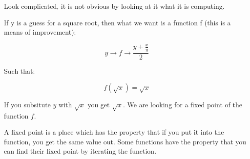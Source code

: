 \documentclass[11pt]{article}
\begin{document}
Look complicated, it is not obvious by looking at it what it is computing.

If y is a guess for a square root, then what we want is a function f
(this is a means of improvement):

$$ y \rightarrow f \rightarrow \frac{y + \frac{x}{y}}{2} $$

Such that: 

$$ f(\sqrt{x}) = \sqrt{x} $$

If you subsitute \(y\) with \(\sqrt{x}\) you get \(\sqrt{x}\).
We are looking for a fixed point of the function \(f\).

A fixed point is a place which has the property that if you put it into the
function, you get the same value out.
Some functions have the property that you can find their fixed point by
iterating the function.
\end{document}
